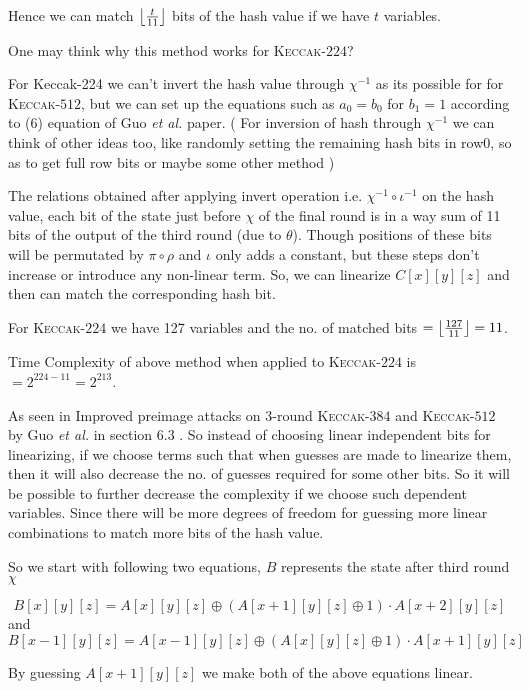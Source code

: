 \documentclass[runningheads]{llncs}
\DeclarePairedDelimiter\floor{\lfloor}{\rfloor}
\newcommand{\KECCAK}{\mbox{\textsc{Keccak}}}
\newcommand{\etal}{\textit{et al. }}
\begin{document}
    Hence we can match $\floor*{ \frac{t}{11} }$ bits of the hash value if we have $t$ variables.
    
    One may think why this method works for \KECCAK-$224$?
    
    For Keccak-224 we can't invert the hash value through $\chi^{-1}$ as its possible for for \KECCAK-$512$, but we can set up the equations such as $a_0 = b_0$ for $b_1 = 1$ according to (6) equation of Guo \etal paper. ( For inversion of hash through $\chi^{-1}$ we can think of other ideas too, like randomly setting the remaining hash bits in row0, so as to get full row bits or maybe some other method )
    
    The relations obtained after applying invert operation i.e. $\chi^{-1} \circ \iota^{-1}$ on the hash value, each bit of the state just before $\chi$ of the final round is in a way sum of 11 bits of the output of the third round (due to $\theta$). Though positions of these bits will be permutated by $\pi \circ \rho$ and $\iota$ only adds a constant, but these steps don't increase or introduce any non-linear term. So, we can linearize $C[x][y][z]$ and then can match the corresponding hash bit.
    
		For \KECCAK-$224$ we have 127 variables and the no. of matched bits $ = \floor*{ \frac{127}{11} } = 11 $.

    Time Complexity of above method when applied to \KECCAK-$224$ is $ = 2^{224 - 11} = 2^{213}$.
    
    As seen in Improved preimage attacks on 3-round \KECCAK-$384$ and \KECCAK-$512$ by Guo \etal in section 6.3 . So instead of choosing linear independent bits for linearizing, if we choose terms such that when guesses are made to linearize them, then it will also decrease the no. of guesses required for some other bits. So it will be possible to further decrease the complexity if we choose such dependent variables. Since there will be more degrees of freedom for guessing more linear combinations to match more bits of the hash value.
    
    So we start with following two equations, $B$ represents the state after third round $\chi$
    
		\[
			B[x][y][z] = A[x][y][z] \oplus (A[x+1][y][z] \oplus 1) \cdot A[x+2][y][z]
		\] and
		\[
			B[x-1][y][z] = A[x-1][y][z] \oplus (A[x][y][z] \oplus 1) \cdot A[x+1][y][z]
		\]

	By guessing $A[x+1][y][z]$ we make both of the above equations linear.
	
\end{document}
